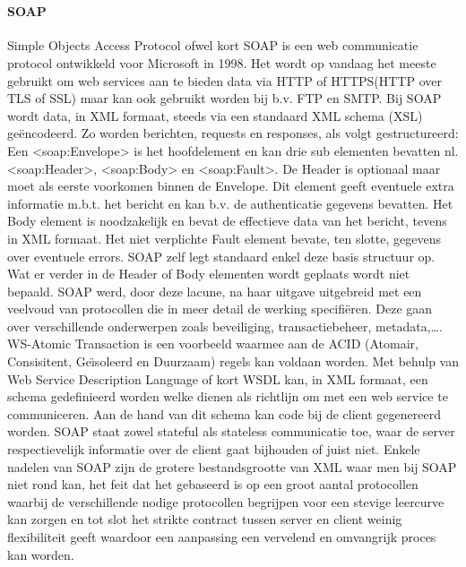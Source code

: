 ~\paragraph{SOAP}
Simple Objects Access Protocol ofwel kort SOAP is een web communicatie protocol ontwikkeld voor Microsoft in 1998. Het wordt op vandaag het meeste gebruikt om
web services aan te bieden data via HTTP of HTTPS(HTTP over TLS of SSL) maar kan ook gebruikt worden bij b.v. FTP en SMTP.
Bij SOAP wordt data, in XML formaat, steeds via een standaard XML schema (XSL) ge\"encodeerd. Zo worden berichten, requests en responses, als volgt gestructureerd:
Een <soap:Envelope> is het hoofdelement en kan drie sub elementen bevatten nl. <soap:Header>, <soap:Body> en <soap:Fault>. De Header is optionaal maar moet
als eerste voorkomen binnen de Envelope. Dit element geeft eventuele extra informatie m.b.t. het bericht en kan b.v. de authenticatie gegevens bevatten. Het Body element
is noodzakelijk en bevat de effectieve data van het bericht, tevens in XML formaat. Het niet verplichte Fault element bevate, ten slotte, gegevens over eventuele errors.\newline
SOAP zelf legt standaard enkel deze basis structuur op. Wat er verder in de Header of Body elementen wordt geplaats wordt niet bepaald. SOAP werd, door deze lacune, na haar
uitgave uitgebreid met een veelvoud van protocollen die in meer detail de werking specifi\"eren. Deze gaan over verschillende onderwerpen zoals beveiliging, transactiebeheer,
metadata,\ldots. WS-Atomic Transaction is een voorbeeld waarmee aan de ACID (Atomair, Consisitent, Ge\"{\i}soleerd en Duurzaam) regels kan voldaan worden.
Met behulp van Web Service Description Language of kort WSDL kan, in XML formaat, een schema gedefinieerd worden welke dienen als richtlijn om met een web service te
communiceren. Aan de hand van dit schema kan code bij de client gegenereerd worden. SOAP staat zowel stateful als stateless communicatie toe, waar de server respectievelijk
informatie over de client gaat bijhouden of juist niet.\newline
Enkele nadelen van SOAP zijn de grotere bestandsgrootte van XML waar men bij SOAP niet rond kan, het feit dat het gebaseerd is op een groot aantal protocollen waarbij
de verschillende nodige protocollen begrijpen voor een stevige leercurve kan zorgen en tot slot het strikte contract tussen server en client weinig flexibiliteit geeft
waardoor een aanpassing een vervelend en omvangrijk proces kan worden.\newline
~\autocite{soap}\\
~\autocite{redhatapissoaprestgraphqlgrpc}\\

